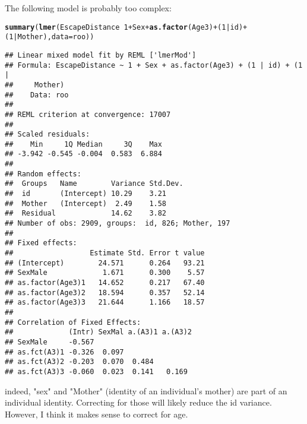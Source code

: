 \documentclass[12pt,a4paper]{scrartcl}\usepackage[]{graphicx}\usepackage[]{color}
\makeatletter
\newcommand{\hlnum}[1]{\textcolor[rgb]{0.686,0.059,0.569}{#1}}%
\newcommand{\hlopt}[1]{\textcolor[rgb]{0,0,0}{#1}}%
\newcommand{\hlstd}[1]{\textcolor[rgb]{0.345,0.345,0.345}{#1}}%
\newcommand{\hlkwc}[1]{\textcolor[rgb]{0.333,0.667,0.333}{#1}}%
\newcommand{\hlkwd}[1]{\textcolor[rgb]{0.737,0.353,0.396}{\textbf{#1}}}%
\newenvironment{kframe}{%
 \def\at@end@of@kframe{}%
 \ifinner\ifhmode%
  \def\at@end@of@kframe{\end{minipage}}%
  \begin{minipage}{\columnwidth}%
 \fi\fi%
 \def\FrameCommand##1{\hskip\@totalleftmargin \hskip-\fboxsep
 \colorbox{shadecolor}{##1}\hskip-\fboxsep
     \hskip-\linewidth \hskip-\@totalleftmargin \hskip\columnwidth}%
 \MakeFramed {\advance\hsize-\width
   \@totalleftmargin\z@ \linewidth\hsize
   \@setminipage}}%
 {\par\unskip\endMakeFramed%
 \at@end@of@kframe}
\newenvironment{knitrout}{}{} %
\makeatother
\begin{document}
\begin{Answer}
The following model is probably too complex:
\begin{knitrout}
\color{fgcolor}\begin{kframe}
\begin{alltt}
\hlkwd{summary}\hlstd{(}\hlkwd{lmer}\hlstd{(EscapeDistance} \hlopt{~} \hlnum{1} \hlopt{+} \hlstd{Sex} \hlopt{+} \hlkwd{as.factor}\hlstd{(Age3)} \hlopt{+} \hlstd{(}\hlnum{1}\hlopt{|}\hlstd{id)} \hlopt{+} \hlstd{(}\hlnum{1}\hlopt{|}\hlstd{Mother),} \hlkwc{data}\hlstd{=roo))}
\end{alltt}
\begin{verbatim}
## Linear mixed model fit by REML ['lmerMod']
## Formula: EscapeDistance ~ 1 + Sex + as.factor(Age3) + (1 | id) + (1 |  
##     Mother)
##    Data: roo
## 
## REML criterion at convergence: 17007
## 
## Scaled residuals: 
##    Min     1Q Median     3Q    Max 
## -3.942 -0.545 -0.004  0.583  6.884 
## 
## Random effects:
##  Groups   Name        Variance Std.Dev.
##  id       (Intercept) 10.29    3.21    
##  Mother   (Intercept)  2.49    1.58    
##  Residual             14.62    3.82    
## Number of obs: 2909, groups:  id, 826; Mother, 197
## 
## Fixed effects:
##                  Estimate Std. Error t value
## (Intercept)        24.571      0.264   93.21
## SexMale             1.671      0.300    5.57
## as.factor(Age3)1   14.652      0.217   67.40
## as.factor(Age3)2   18.594      0.357   52.14
## as.factor(Age3)3   21.644      1.166   18.57
## 
## Correlation of Fixed Effects:
##             (Intr) SexMal a.(A3)1 a.(A3)2
## SexMale     -0.567                       
## as.fct(A3)1 -0.326  0.097                
## as.fct(A3)2 -0.203  0.070  0.484         
## as.fct(A3)3 -0.060  0.023  0.141   0.169
\end{verbatim}
\end{kframe}
\end{knitrout}
indeed, "sex" and "Mother" (identity of an individual's mother) are part of an individual identity. Correcting for those will likely reduce the id variance. However, I think it makes sense to correct for age.



\end{Answer}
\end{document}
